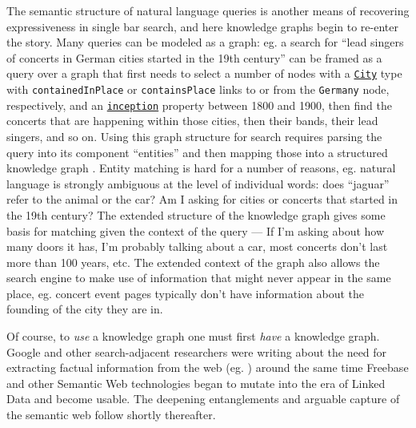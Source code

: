 The semantic structure of natural language queries is another means of
recovering expressiveness in single bar search, and here knowledge
graphs begin to re-enter the story. Many queries can be modeled as a
graph: eg. a search for ``lead singers of concerts in German cities
started in the 19th century'' can be framed as a query over a graph that
first needs to select a number of nodes with a
\href{https://schema.org/City}{\texttt{City}} type with
\texttt{containedInPlace} or \texttt{containsPlace} links to or from the
\texttt{Germany} node, respectively, and an
\href{https://www.wikidata.org/wiki/Property:P571}{\texttt{inception}}
property between 1800 and 1900, then find the concerts that are
happening within those cities, then their bands, their lead singers, and
so on. Using this graph structure for search requires parsing the query
into its component ``entities'' and then mapping those into a structured
knowledge graph \cite{liUnderstandingSemanticStructure2010, reisingerFineGrainedClassLabel2011, pascaWhatYouSeek2007} . Entity
matching is hard for a number of reasons, eg. natural language is
strongly ambiguous at the level of individual words: does ``jaguar''
refer to the animal or the car? Am I asking for cities or concerts that
started in the 19th century? The extended structure of the knowledge
graph gives some basis for matching given the context of the query ---
If I'm asking about how many doors it has, I'm probably talking about a
car, most concerts don't last more than 100 years, etc. The extended
context of the graph also allows the search engine to make use of
information that might never appear in the same place, eg. concert event
pages typically don't have information about the founding of the city
they are in.

Of course, to \emph{use} a knowledge graph one must first \emph{have} a
knowledge graph. Google and other search-adjacent researchers were
writing about the need for extracting factual information from the web
(eg. \cite{halevyUnreasonableEffectivenessData2009, pascaTurningWebText2008, pascaWeaklysupervisedDiscoveryNamed2007, pascaOrganizingSearchingWorld2007, pascaOrganizingSearchingWorld2006, pascaAcquisitionCategorizedNamed2004} ) around the same time Freebase
and other Semantic Web technologies began to mutate into the era of
Linked Data and become usable. The deepening entanglements and arguable
capture of the semantic web follow shortly thereafter.

